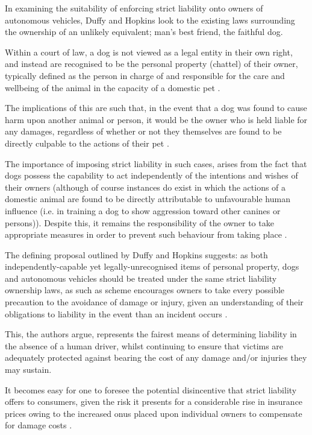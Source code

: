 \documentclass[conference]{IEEEtran}
\begin{document}
In examining the suitability of enforcing strict liability onto owners of autonomous vehicles, Duffy and Hopkins \cite{duffy} look to the existing laws surrounding the ownership of an unlikely equivalent; man's best friend, the faithful dog.

Within a court of law, a dog is not viewed as a legal entity in their own right,  and instead are recognised to be the personal property (chattel) of their owner, typically defined as the person in charge of and responsible for the care and wellbeing of the animal in the capacity of a domestic pet \cite{pet-law}.

The implications of this are such that, in the event that a dog was found to cause harm upon another animal or person, it would be the owner who is held liable for any damages, regardless of whether or not they themselves are found to be directly culpable to the actions of their pet \cite{duffy}. 

The importance of imposing strict liability in such cases, arises from the fact that dogs possess the capability to act independently of the intentions and wishes of their owners (although of course instances do exist in which the actions of a domestic animal are found to be directly attributable to unfavourable human influence (i.e. in training a dog to show aggression toward other canines or persons)). Despite this, it remains the responsibility of the owner to take appropriate measures in order to prevent such behaviour from taking place \cite{duffy}.

The defining proposal outlined by Duffy and Hopkins \cite{duffy} suggests: as both independently-capable yet legally-unrecognised items of personal property, dogs and autonomous vehicles should be treated under the same strict liability ownership laws, as such as scheme encourages owners to take every possible precaution to the avoidance of damage or injury, given an understanding of their obligations to liability in the event than an incident occurs \cite{duffy}. 

This, the authors argue, represents the fairest means of determining liability in the absence of a human driver, whilst continuing to ensure that victims are adequately protected against bearing the cost of any damage and/or injuries they may sustain. 

It becomes easy for one to foresee the potential disincentive that strict liability offers to consumers, given the risk it presents for a considerable rise in insurance prices owing to the increased onus placed upon individual owners to compensate for damage costs \cite{duffy}. 
\end{document}
